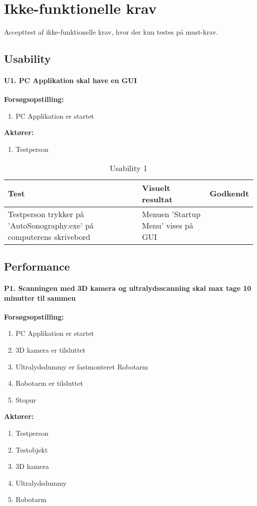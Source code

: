 \chapter{Ikke-funktionelle krav}\label{Ikkefunktionellekrav}
Accepttest af ikke-funktionelle krav, hvor der kun testes på must-krav. 

\section{Usability}
\subsubsection{U1. PC Applikation skal have en GUI}
\textbf{Forsøgsopstilling:}
\begin{enumerate}
\item PC Applikation er startet 
\end{enumerate}
\textbf{Aktører:}
\begin{enumerate}
\item Testperson
\end{enumerate} 

\begin{table}[htb]
\begin{tabularx}{\textwidth}{|X|X|p{2cm}|}
\hline
\textbf{Test} & \textbf{Visuelt resultat} &\textbf{Godkendt}\\\hline    
Testperson trykker på 'AutoSonography.exe' på computerens skrivebord & Menuen 'Startup Menu' vises på GUI &\\\hline
\end{tabularx}
\caption{Usability 1}
\label{U1}
\end{table}

\newpage

\section{Performance}
\subsubsection{P1. Scanningen med 3D kamera og ultralydsscanning skal max tage 10 minutter til sammen}
\textbf{Forsøgsopstilling:}
\begin{enumerate}
\item PC Applikation er startet
\item 3D kamera er tilsluttet
\item Ultralydsdummy er fastmonteret Robotarm
\item Robotarm er tilsluttet
\item Stopur
\end{enumerate}
\textbf{Aktører:}
\begin{enumerate}
\item Testperson
\item Testobjekt
\item 3D kamera 
\item Ultralydsdummy
\item Robotarm
\end{enumerate}

